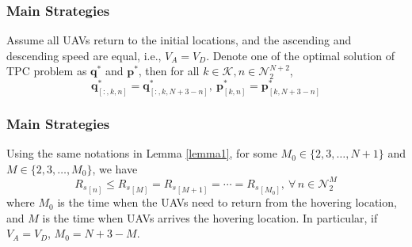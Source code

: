 \documentclass[handout,11.5pt]{beamer}
\begin{document}
\begin{frame}
\frametitle{Main Strategies}
	\begin{lemma}\label{lemma1}
		Assume all UAVs return to the initial locations, and the ascending and descending speed are equal, i.e., $V_A=V_D$. Denote one of the optimal solution of TPC problem as $\boldsymbol{q}^*$ and $\boldsymbol{p}^*$, then for all $k\in\mathcal{K},n\in\mathcal{N}_2^{N+2}$,
		\begin{equation}\label{lemma1eq}
			\boldsymbol{q}^*_{[:,k,n]} = \boldsymbol{q}^*_{[:,k,N+3-n]},\ \boldsymbol{p}^*_{[k,n]} = \boldsymbol{p}^*_{[k,N+3-n]}
		\end{equation}
	\end{lemma}
\end{frame}


\begin{frame}
\frametitle{Main Strategies}
	\begin{lemma}
		Using the same notations in {\rm Lemma \ref{lemma1}}, for some $M_0\in\{2,3,\ldots,N+1\}$ and $M\in\{2,3,\ldots,M_0\}$, we have
		\begin{equation}\label{lemma2eq}
			{R_s}_{[n]}\leq {R_s}_{[M]}={R_s}_{[M+1]}=\cdots={R_s}_{[M_0]},\ \forall\,n\in\mathcal{N}_2^M
		\end{equation}
		where $M_0$ is the time when the UAVs need to return from the hovering location, and $M$ is the time when UAVs arrives the hovering location. In particular, if $V_A=V_D$, $M_0=N+3-M$.
	\end{lemma}
\end{frame}
\end{document}
